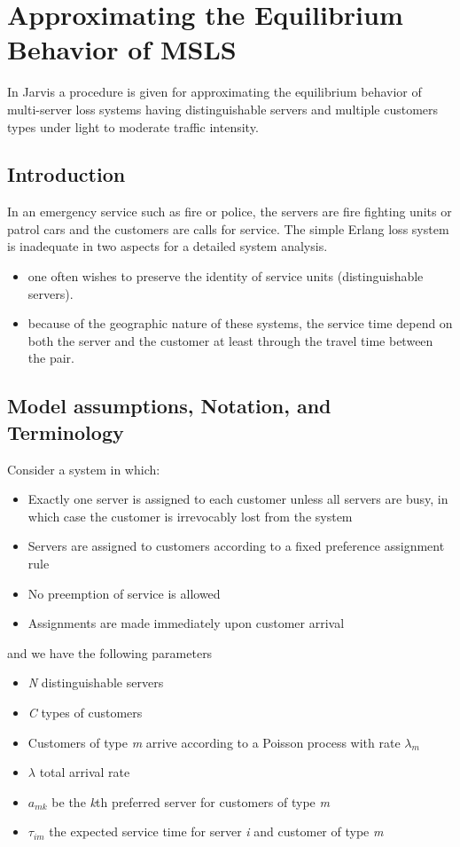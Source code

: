 
\chapter{Approximating the Equilibrium Behavior of MSLS}
\label{ch:Jarvis}
In Jarvis \cite{jarvis1985approximating}
a procedure is given
for approximating the equilibrium behavior
of multi-server loss systems having distinguishable servers
and multiple customers types
under light to moderate traffic intensity.

\section{Introduction}
In an emergency service such as fire or police, 
the servers are fire fighting units or patrol cars
and the customers are calls for service.
The simple Erlang loss system
is inadequate in two aspects for a detailed system analysis.
\begin{itemize}
\item one often wishes
  to preserve the identity of service units (distinguishable servers).
\item because
  of the geographic nature of these systems,
  the service time depend on both
  the server and the customer
  at least through the travel time between the pair.
\end{itemize}

\section{Model assumptions, Notation, and Terminology}
Consider a system in which:
\begin{itemize}
\item Exactly one server
  is assigned to each customer
  unless all servers are busy, 
  in which case
  the customer is irrevocably lost from the system
\item Servers are assigned
  to customers according to a fixed preference assignment rule
\item No preemption of service is allowed
\item Assignments are made immediately
  upon customer arrival
\end{itemize}

and we have the following parameters
\begin{itemize}
\item \textit{N} distinguishable servers
\item \textit{C} types of customers
\item Customers of type \textit{m}
  arrive according to a Poisson process with rate $\lambda_{m}$
\item $\lambda$ total arrival rate
\item $a_{mk}$ be the \textit{k}th preferred server
  for customers of type \textit{m}
\item $\tau_{im}$ the expected service time
  for server \textit{i} and customer of type \textit{m}
\end{itemize}

